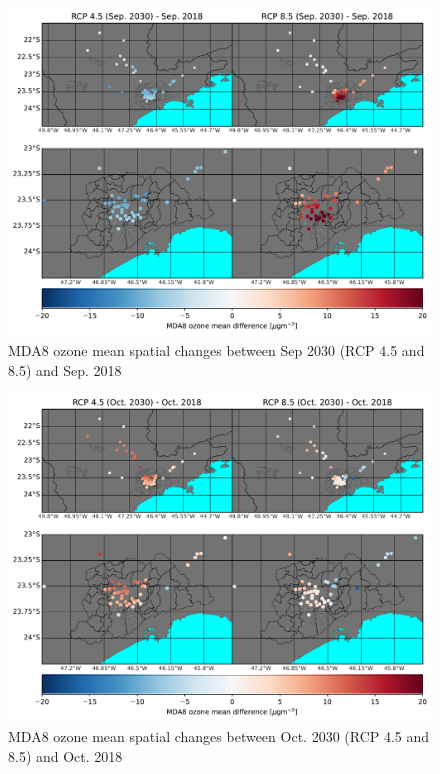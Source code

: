 
\begin{figure}[hbt]
\begin{center}
	\includegraphics[width=1\textwidth]{fig/mda8_spatial_station_Sep}
\end{center}
  \caption{MDA8 ozone mean spatial changes between Sep 2030 (RCP 4.5 and 8.5) and Sep. 2018}
  \label{fig:spatial_o3_sep}
\end{figure}

\begin{figure}[hbt]
  \includegraphics[width=1\textwidth]{fig/mda8_spatial_station_Oct}
  \caption{MDA8 ozone mean spatial changes between Oct. 2030 (RCP 4.5 and 8.5) and Oct. 2018}
  \label{fig:spatial_o3_oct}
\end{figure}


